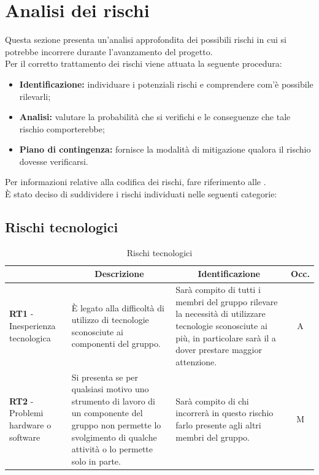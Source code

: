 \section{Analisi dei rischi} \label{section:analisi_dei_rischi}
Questa sezione presenta un'analisi approfondita dei possibili rischi in cui si potrebbe incorrere durante l'avanzamento del progetto.\\
Per il corretto trattamento dei rischi viene attuata la seguente procedura:
\begin{itemize}
  \item \textbf{Identificazione:} individuare i potenziali rischi e comprendere com'è possibile rilevarli;
  \item \textbf{Analisi:} valutare la probabilità che si verifichi e le conseguenze che tale rischio comporterebbe;
  \item \textbf{Piano di contingenza:} fornisce la modalità di mitigazione qualora il rischio dovesse verificarsi.
\end{itemize}
Per informazioni relative alla codifica dei rischi, fare riferimento alle \docNameVersionNdP.\\
È stato deciso di suddividere i rischi individuati nelle seguenti categorie:

\subsection{Rischi tecnologici} \label{subsection:rischi_tecnologici}
\begin{table}[H]
  \centering
  \renewcommand{\arraystretch}{1.8}
  \begin{tabular}{p{5.5cm}|p{5cm}|p{5cm}|c}
    \rowcolor[HTML]{125E28} 
    \multicolumn{1}{c}{\color[HTML]{FFFFFF}\textbf{Codice}}
    & \multicolumn{1}{c}{\color[HTML]{FFFFFF}\textbf{Descrizione}}
    & \multicolumn{1}{c}{\color[HTML]{FFFFFF}\textbf{Identificazione}}
    & \color[HTML]{FFFFFF}\textbf{Occ.}\\
    \hline
    \textbf{RT1} - Inesperienza tecnologica & È legato alla difficoltà di utilizzo di tecnologie sconosciute ai componenti del gruppo. & Sarà compito di tutti i membri del gruppo rilevare la necessità di utilizzare tecnologie sconosciute ai più, in particolare sarà il \roleProjectManager{} a dover prestare maggior attenzione. & A \\
    \textbf{RT2} - Problemi hardware o software & Si presenta se per qualsiasi motivo uno strumento di lavoro di un componente del gruppo non permette lo svolgimento di qualche attività o lo permette solo in parte. &  Sarà compito di chi incorrerà in questo rischio farlo presente agli altri membri del gruppo. & M \\
  \end{tabular}
  \caption{Rischi tecnologici}
\end{table}

